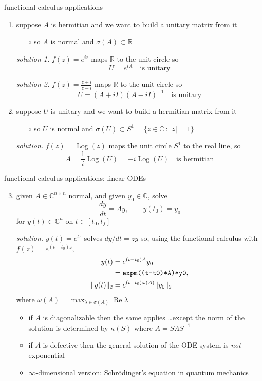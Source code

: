 \documentclass[10pt,hyperref]{beamer}
\newcommand{\CC}{\mathbb{C}}
\newcommand{\RR}{\mathbb{R}}
\begin{document}
\begin{frame}{functional calculus applications}

\begin{enumerate}
\item suppose $A$ is hermitian and we want to build a unitary matrix from it
    \begin{itemize}
    \item[$\circ$] so $A$ is normal and $\sigma(A) \subset \RR$
    \end{itemize}

\medskip
\emph{solution 1.} $f(z) = e^{iz}$ maps $\RR$ to the unit circle so
    $$U = e^{iA} \quad \text{is unitary}$$

\emph{solution 2.} $\displaystyle f(z) = \frac{z+i}{z-i}$ maps $\RR$ to the unit circle so
    $$U = (A+iI)(A-iI)^{-1} \quad \text{is unitary}$$

\medskip
\item suppose $U$ is unitary and we want to build a hermitian matrix from it
    \begin{itemize}
    \item[$\circ$] so $U$ is normal and $\sigma(U) \subset S^1 = \{z\in \CC\,:\, |z|=1\}$
    \end{itemize}
\newcommand{\Log}{\operatorname{Log}}

\medskip
\emph{solution.} $f(z) = \Log(z)$ maps the unit circle $S^1$ to the real line, so
    $$A = \frac{1}{i} \Log(U) = -i \Log(U) \quad \text{is hermitian}$$
\end{enumerate}
\end{frame}


\begin{frame}{functional calculus applications: linear ODEs}

\begin{enumerate}
\setcounter{enumi}{2}
\item given $A \in \CC^{n\times n}$ normal, and given $y_0\in\CC$, solve
    $$\frac{dy}{dt} = A y, \qquad y(t_0) = y_0$$
for $y(t) \in \CC^n$ on $t\in [t_0,t_f]$ 

\medskip
\emph{solution.} $y(t) = e^{tz}$ solves $dy/dt=zy$ so, using the functional calculus with $f(z) = e^{(t-t_0)z}$,
\begin{align*}
    y(t) &= e^{(t-t_0)A} y_0 \\
         &= \text{\texttt{expm((t-t0)*A)*y0}}, \\
  \|y(t)\|_2 &= e^{(t-t_0)\omega(A)}\|y_0\|_2
\end{align*}
where $\omega(A) = \max_{\lambda\in\sigma(A)} \operatorname{Re} \lambda$
\begin{itemize}
\item if $A$ is diagonalizable then the same applies \dots except the norm of the solution is determined by $\kappa(S)$ where $A=S \Lambda S^{-1}$
\item if $A$ is defective then the general solution of the ODE system is \emph{not} exponential
\item $\infty$-dimensional version: Schr\"odinger's equation in quantum mechanics
\end{itemize}
\end{enumerate}
\end{frame}
\end{document}
